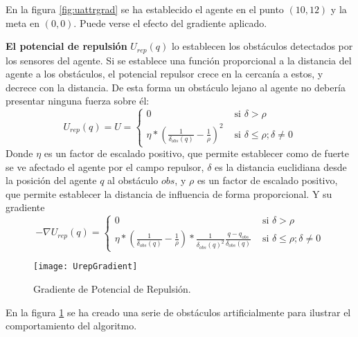 En la figura \ref{fig:uattrgrad} se ha establecido el agente en el punto $(10,12)$ y la meta en $(0,0)$. Puede verse el efecto del gradiente aplicado.

\textbf{El potencial de repulsión} $U_{rep}(q)$ lo establecen los obstáculos detectados por los sensores del agente. Si se establece una función proporcional a la distancia del agente a los obstáculos, el potencial repulsor crece en la cercanía a estos, y decrece con la distancia. De esta forma un obstáculo lejano al agente no debería presentar ninguna fuerza sobre él:
\begin{equation}
U_{rep}(q) = U = \begin{cases}
0 & \text{ si } \delta > \rho \\ 
\eta * (\frac{1}{\delta_{obs}(q)}-\frac{1}{\rho})^2 & \text{ si } \delta \leq \rho; \delta \neq 0 
\end{cases}
\label{equation:Urepq}
\end{equation}
Donde $\eta$ es un factor de escalado positivo, que permite establecer como de fuerte se ve afectado el agente por el campo repulsor, $\delta$ es la distancia euclidiana desde la posición del agente $q$ al obstáculo $obs$, y $\rho$ es un factor de escalado positivo, que permite establecer la distancia de influencia de forma proporcional. Y su gradiente
\begin{equation}
-\nabla U_{rep}(q) = \begin{cases} 0 & \text{ si } \delta > \rho \\
\eta * (\frac{1}{\delta_{obs}(q)}-\frac{1}{\rho}) * \frac{1}{\delta_{obs}(q)^2}\frac{q-q_{obs}}{\delta_{obs}(q)} & \text{ si }  \delta \leq \rho; \delta \neq 0  
\end{cases}
\label{equation:dUrepq}
\end{equation}
\begin{figure}[H]
	\centering
	\texttt{[image: UrepGradient]}
	\caption{Gradiente de Potencial de Repulsión.}\label{fig:urepgrad}
\end{figure}

 En la figura \ref{fig:urepgrad} se ha creado una serie de obstáculos artificialmente para ilustrar el comportamiento del algoritmo. 

 \newpage
